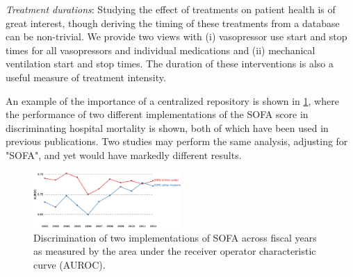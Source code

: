 \documentclass{bioinfo}
\begin{document}
\begin{methods}
\emph{Treatment durations}: Studying the effect of treatments on patient health is of great interest, though deriving the timing of these treatments from a database can be non-trivial. We provide two views with (i) vasopressor use start and stop times for all vasopressors and individual medications and (ii) mechanical ventilation start and stop times. The duration of these interventions is also a useful measure of treatment intensity.

An example of the importance of a centralized repository is shown in \ref{fig:SevScoresOverTime}, where the performance of two different implementations of the SOFA score in discriminating hospital mortality is shown, both of which have been used in previous publications. Two studies may perform the same analysis, adjusting for "SOFA", and yet would have markedly different results.






\begin{figure}[!tpb]%
\centerline{\includegraphics[width=0.5\textwidth]{SOFA.eps}}
\caption{Discrimination of two implementations of SOFA across fiscal years as measured by the area under the receiver operator characteristic curve (AUROC).}\label{fig:SevScoresOverTime}
\end{figure}

\end{methods}
\end{document}
